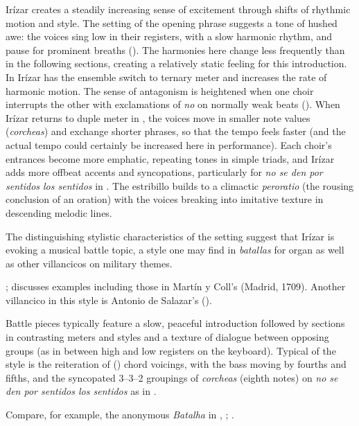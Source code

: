 Irízar creates a steadily increasing sense of excitement through shifts of
rhythmic motion and style.
The setting of the opening phrase suggests a tone of hushed awe: the voices sing
low in their registers, with a slow harmonic rhythm, and pause for prominent
breaths ().
The harmonies here change less frequently than in the following sections,
creating a relatively static feeling for this introduction.
In  Irízar has the ensemble switch to ternary meter and increases
the rate of harmonic motion.
The sense of antagonism is heightened when one choir interrupts the other with
exclamations of \emph{no} on normally weak beats ().
When Irízar returns to duple meter in , the voices move in smaller
note values (\emph{corcheas}) and exchange shorter phrases, so that the tempo
feels faster (and the actual tempo could certainly be increased here in
performance).
Each choir's entrances become more emphatic, repeating tones in simple triads,
and Irízar adds more offbeat accents and syncopations, particularly for \emph{no
se den por sentidos los sentidos} in .
The estribillo builds to a climactic \emph{peroratio} (the rousing conclusion of
an oration) with the voices breaking into imitative texture in descending
melodic lines.

The distinguishing stylistic characteristics of the setting suggest that Irízar
is evoking a musical battle topic, a style one may find in \emph{batallas} for
organ as well as other villancicos on military themes.%
\begin{Footnote}
    \Autocite[]{Grove}; 
    \autocite{Sutton:IberianBatalla} discusses examples including those in
    Martín y Coll's  (Madrid, 1709).
    Another villancico in this style is Antonio de Salazar's  ().
\end{Footnote}
Battle pieces typically feature a slow, peaceful introduction followed by
sections in contrasting meters and styles and a texture of dialogue between
opposing groups (as in between high and low registers on the keyboard).  
Typical of the style is the reiteration of  () chord voicings, with the bass moving by fourths and fifths, and the
syncopated 3--3--2 groupings of \emph{corcheas} (eighth notes) on \emph{no se
den por sentidos los sentidos} as in .%
\begin{Footnote}
    Compare, for example, the anonymous \emph{Batalha} in ,
    ; \autocite{Araujo:Batalla}.  
\end{Footnote}

